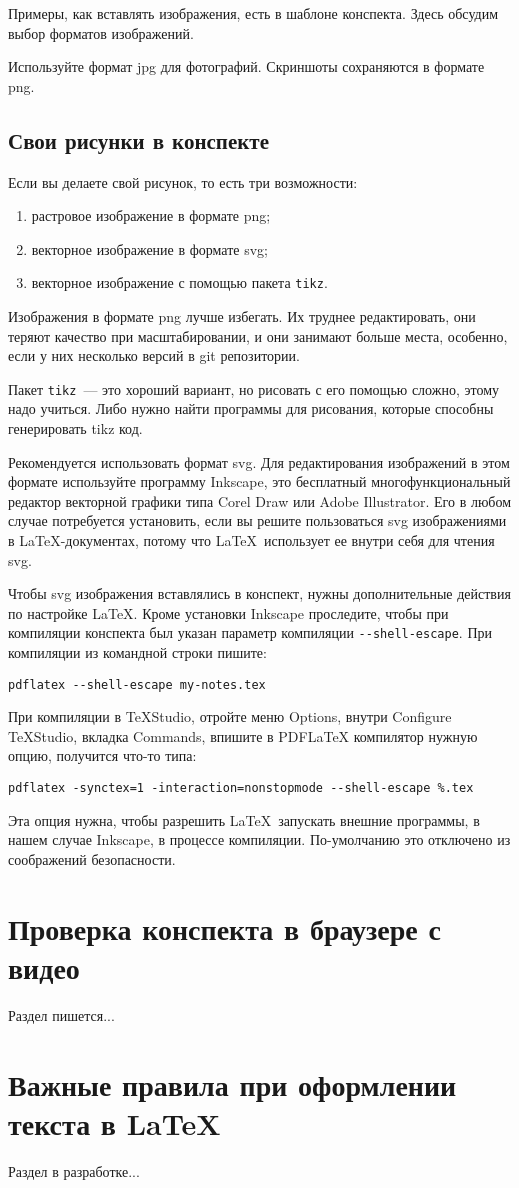 \documentclass{article}
\begin{document}
    Примеры, как вставлять изображения, есть в шаблоне конспекта. Здесь обсудим выбор форматов изображений.

    Используйте формат jpg для фотографий. Скриншоты сохраняются в формате png.

    \subsection{Свои рисунки в конспекте}
    Если вы делаете свой рисунок, то есть три возможности:
    \begin{enumerate}
        \item растровое изображение в формате png;
        \item векторное изображение в формате svg;
        \item векторное изображение с помощью пакета \texttt{tikz}.
    \end{enumerate}

    Изображения в формате png лучше избегать. Их труднее редактировать, они теряют качество при масштабировании,
    и они занимают больше места, особенно, если у них несколько версий в git репозитории.

    Пакет \texttt{tikz}~--- это хороший вариант, но рисовать с его помощью сложно, этому надо учиться. Либо нужно
    найти программы для рисования, которые способны генерировать tikz код.

    Рекомендуется использовать формат svg. Для редактирования изображений в этом формате используйте программу
    Inkscape, это бесплатный многофункциональный редактор векторной графики типа Corel Draw или Adobe Illustrator.
    Его в любом случае потребуется установить, если вы решите пользоваться svg изображениями в \LaTeX-документах,
    потому что \LaTeX\ использует ее внутри себя для чтения svg.

    Чтобы svg изображения вставлялись в конспект, нужны дополнительные действия по настройке \LaTeX.
    Кроме установки Inkscape проследите, чтобы при компиляции конспекта был указан параметр компиляции
    \texttt{{-}-shell-escape}. При компиляции из командной строки пишите:
    \begin{verbatim}pdflatex --shell-escape my-notes.tex
    \end{verbatim}
    При компиляции в TeXStudio, отройте меню Options, внутри Configure TeXStudio, вкладка Commands, впишите
    в PDFLaTeX компилятор нужную опцию, получится что-то типа:
    \begin{verbatim}pdflatex -synctex=1 -interaction=nonstopmode --shell-escape %.tex
    \end{verbatim}
    Эта опция нужна, чтобы разрешить \LaTeX\ запускать внешние программы, в нашем случае Inkscape, в процессе
    компиляции. По-умолчанию это отключено из соображений безопасности.


    \section{Проверка конспекта в браузере с видео}
    Раздел пишется...

    \section{Важные правила при оформлении текста в LaTeX}
    Раздел в разработке...
\end{document}
